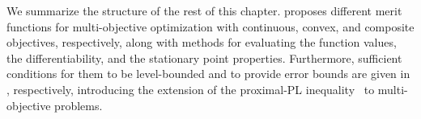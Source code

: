 \documentclass[../main]{subfiles}
\begin{document}
We summarize the structure of the rest of this chapter.
 proposes different merit functions for multi-objective optimization with continuous, convex, and composite objectives, respectively, along with methods for evaluating the function values, the differentiability, and the stationary point properties.
Furthermore, sufficient conditions for them to be level-bounded and to provide error bounds are given in , respectively, introducing the extension of the proximal-PL inequality~\cite{Chambolle2015} to multi-objective problems.
\end{document}
